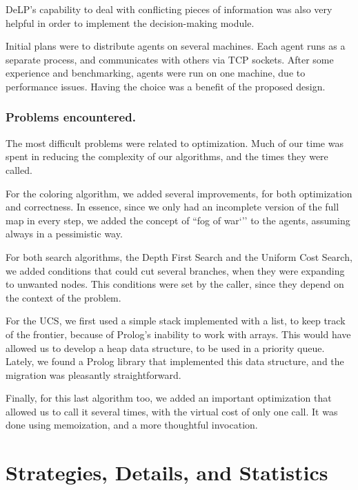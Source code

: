 \documentclass{llncs2e/llncs}
\begin{document}
    DeLP's capability to deal with conflicting pieces of information was also very
    helpful in order to implement the decision-making module.
    
    Initial plans were to distribute agents on several machines. Each agent runs 
    as a separate process, and communicates with others via TCP sockets. After 
    some experience and benchmarking, agents were run on one machine, due to 
    performance issues. 
    Having the choice was a benefit of the proposed design.

\subsubsection{Problems encountered.}

    The most difficult problems were related to optimization. Much of our time was 
    spent in reducing the complexity of our algorithms, and the times they 
    were called.

    For the coloring algorithm, we added several improvements, for both 
    optimization and correctness. In essence, since we only had an incomplete 
    version of the full map in every step, we added the concept of ``fog of war`'' 
    to the agents, assuming always in a pessimistic way. 

    For both search algorithms, the Depth First Search and the Uniform Cost 
    Search, we added conditions that could cut several branches, when they were 
    expanding to unwanted nodes. This conditions were set by the caller, since 
    they depend on the context of the problem.

    For the UCS, we first used a simple stack implemented with a list, to keep 
    track of the frontier, because of Prolog's inability to work with arrays. This 
    would have allowed us to develop a heap data structure, to be used in a 
    priority queue. Lately, we found a Prolog library that implemented this data 
    structure, and the migration was pleasantly straightforward.

    Finally, for this last algorithm too, we added an important optimization 
    that allowed us to call it several times, with the virtual cost of only one 
    call. It was done using memoization, and a more thoughtful invocation.


\section{Strategies, Details, and Statistics}
\end{document}
